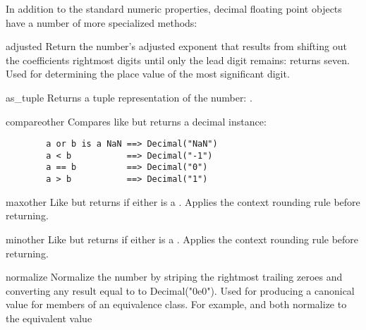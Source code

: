In addition to the standard numeric properties, decimal floating point objects
have a number of more specialized methods:

\begin{methoddesc}{adjusted}{}
  Return the number's adjusted exponent that results from shifting out the
  coefficients rightmost digits until only the lead digit remains:
   returns seven.  Used for determining
  the place value of the most significant digit.
\end{methoddesc}

\begin{methoddesc}{as_tuple}{}
  Returns a tuple representation of the number:
  .
\end{methoddesc}

\begin{methoddesc}{compare}{other}
  Compares like  but returns a decimal instance:
  \begin{verbatim}
        a or b is a NaN ==> Decimal("NaN")
        a < b           ==> Decimal("-1")
        a == b          ==> Decimal("0")
        a > b           ==> Decimal("1")
  \end{verbatim}
\end{methoddesc}

\begin{methoddesc}{max}{other}
  Like  but returns  if either is a
  .  Applies the context rounding rule before returning.
\end{methoddesc}

\begin{methoddesc}{min}{other}
  Like  but returns  if either is a
  .  Applies the context rounding rule before returning.
\end{methoddesc}

\begin{methoddesc}{normalize}{}
  Normalize the number by striping the rightmost trailing zeroes and
  converting any result equal to  to Decimal("0e0").
  Used for producing a canonical value for members of an equivalence class.
  For example,  and 
  both normalize to the equivalent value 
\end{methoddesc}                                              

